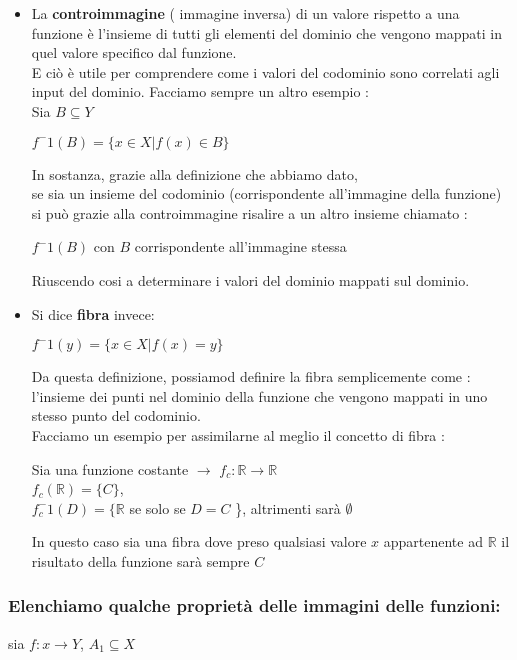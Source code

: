 \documentclass[article,12pt]{book}
\begin{document}
\begin{enumerate}
{\begin{itemize}
    \item La \textbf{controimmagine} ( immagine inversa) di un valore rispetto a una funzione è l'insieme di tutti gli elementi del dominio che vengono mappati in quel valore specifico dal funzione. \\
    E ciò è utile per comprendere come i valori del codominio sono correlati agli input del dominio.
    Facciamo sempre un altro esempio : \\
    Sia $B \subseteq Y$
    \begin{center}
        $f^-1 (B) = \{x \in X | f(x) \in B \}$
    \end{center}
In sostanza, grazie alla definizione che abbiamo dato, \\
se sia un insieme del codominio (corrispondente all'immagine della funzione) si può grazie alla controimmagine risalire a un altro insieme chiamato :
    \begin{center}
        $f^-1(B)$ con $B$ corrispondente all'immagine stessa
    \end{center}
Riuscendo cosi a determinare i valori del dominio mappati sul dominio.
    \item Si dice \textbf{fibra} invece: 
        \begin{center}
            $f^-1 (y) = \{x \in X | f(x) = y \}$
                \end{center}
Da questa definizione, possiamod definire la fibra semplicemente come : l'insieme dei punti nel dominio della funzione che vengono mappati in uno stesso punto del codominio.  \\
Facciamo un esempio per assimilarne al meglio il concetto di fibra :
    \begin{center}
        Sia una funzione costante $\rightarrow$ $f_c : \mathbb{R} \rightarrow \mathbb{R}$ \\[2EX]
        $f_c (\mathbb{R}) = \{C \}$, \\[1EX]
        $f_c ^-1 (D) = \{ \mathbb{R}$ se solo se $D = C$ \}, altrimenti sarà $\emptyset$
        
    \end{center}
In questo caso sia una fibra dove preso qualsiasi valore $x$ appartenente ad $\mathbb{R}$ il risultato della funzione sarà sempre $C$
\end{itemize}
\newpage
\subsubsection{Elenchiamo qualche proprietà delle immagini delle funzioni:} sia $f : x \rightarrow Y$, $A_1 \subseteq X$
}
\end{enumerate}
\end{document}
